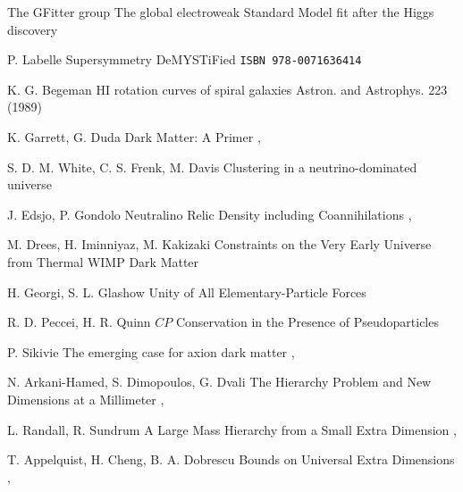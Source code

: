 {The GFitter group}
{The global electroweak Standard Model fit after the Higgs discovery}
{}

{P. Labelle}
{Supersymmetry DeMYSTiFied}
{\texttt{ISBN 978-0071636414}}

{K. G. Begeman}
{HI rotation curves of spiral galaxies}
{Astron. and Astrophys. 223 (1989)}

{K. Garrett, G. Duda}
{Dark Matter: A Primer}
{, }

{S. D. M. White, C. S. Frenk, M. Davis}
{Clustering in a neutrino-dominated universe}
{}

{J. Edsjo, P. Gondolo}
{Neutralino Relic Density including Coannihilations}
{, }

{M. Drees, H. Iminniyaz, M. Kakizaki}
{Constraints on the Very Early Universe from Thermal WIMP Dark Matter}
{ }

{H. Georgi, S. L. Glashow}
{Unity of All Elementary-Particle Forces}
{}

{R. D. Peccei, H. R. Quinn}
{$CP$ Conservation in the Presence of Pseudoparticles}
{}

{P. Sikivie}
{The emerging case for axion dark matter}
{, }

{N. Arkani-Hamed, S. Dimopoulos, G. Dvali}
{The Hierarchy Problem and New Dimensions at a Millimeter}
{, }

{L. Randall, R. Sundrum}
{A Large Mass Hierarchy from a Small Extra Dimension}
{, }

{T. Appelquist, H. Cheng, B. A. Dobrescu}
{Bounds on Universal Extra Dimensions}
{, }


